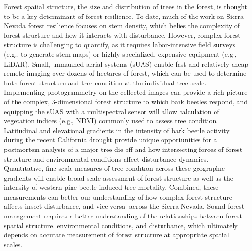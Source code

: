 \documentclass[]{article}
\begin{document}
Forest spatial structure, the size and distribution of trees in the
forest, is thought to be a key determinant of forest resilience. To
date, much of the work on Sierra Nevada forest resilience focuses on
stem density, which belies the complexity of forest structure and how it
interacts with disturbance. However, complex forest structure is
challenging to quantify, as it requires labor-intensive field surveys
(e.g., to generate stem maps) or highly specialized, expensive equipment
(e.g., LiDAR). Small, unmanned aerial systems (sUAS) enable fast and
relatively cheap remote imaging over dozens of hectares of forest, which
can be used to determine both forest structure and tree condition at the
individual tree scale. Implementing photogrammetry on the collected
images can provide a rich picture of the complex, 3-dimensional forest
structure to which bark beetles respond, and equipping the sUAS with a
multispectral sensor will allow calculation of vegetation indices (e.g.,
NDVI) commonly used to assess tree condition. Latitudinal and
elevational gradients in the intensity of bark beetle activity during
the recent California drought provide unique opportunities for a
postmortem analysis of a major tree die off and how intersecting forces
of forest structure and environmental conditions affect disturbance
dynamics. Quantitative, fine-scale measures of tree condition across
these geographic gradients will enable broad-scale assessment of forest
structure as well as the intensity of western pine beetle-induced tree
mortality. Combined, these measurements can better our understanding of
how complex forest structure affects insect disturbance, and vice versa,
across the Sierra Nevada. Sound forest management requires a better
understanding of the relationships between forest spatial structure,
environmental conditions, and disturbance, which ultimately depends on
accurate measurement of forest structure at appropriate spatial scales.
\end{document}
